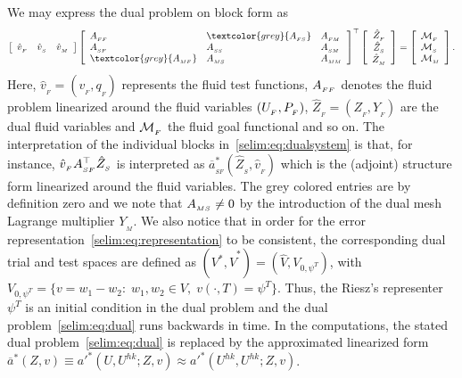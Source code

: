 We may express the dual problem on block form as
\begin{eqnarray}
\label{selim:eq:dualsystem}
\left[\begin{array}{ccc} \hat{v}_{_{F}} & \hat{v}_{_{S}} & \hat{v}_{_{M}}
  \end{array} \right]
\left[\begin{array}{lll} \AFF & \textcolor{grey}{\AFS} & \AFM
    \\ \ASF & \ASS & \ASM \\ \textcolor{grey}{\AMF} & \AMS &
    \AMM
\end{array} \right]^{\top}
\left[ \begin{array}{c} \hat{Z}_{_{F}} \\ \hat{Z}_{_{S}}
    \\ \hat{Z}_{_{M}} \end{array} \right] =\left[ \begin{array}{l}
    \M_{_{F}}\\ \M_{{_S}}\\ \M_{_{M}} \end{array} \right].
\end{eqnarray}
Here, $\hat{v}_{_{F}} = (v_{_{F}}, q_{_{F}})$ represents the fluid
test functions, $A_{_{FF}}$ denotes the fluid problem linearized around the
fluid variables $(U_{_{F}},P_{_{F}})$, $\hat{Z}_{_{F}} = (Z_{_{F}}, Y_{_{F}})$
are the dual fluid variables and $\mathcal{M}_{_{F}}$ the fluid goal functional
and so on. The interpretation of the individual blocks
in~\eqref{selim:eq:dualsystem} is that, for instance,
$\hat{v}_{_{F}}A_{_{SF}}^{\top}\hat{Z}_{_{S}} $ is interpreted as
$\overline{a}^*_{_{SF}}(\hat{Z}_{_{S}}, \hat{v}_{_{F}})$ which is the
(adjoint) structure form linearized around the fluid variables.  The
grey colored entries are by definition zero and we note that $A_{_{MS}}
\neq 0$ by the introduction of the dual mesh Lagrange multiplier
$Y_{_{M}}$. We also notice that in order for the error
representation~\eqref{selim:eq:representation} to be consistent, the
corresponding dual trial and test spaces are defined as $(V^*,
\hat{V}^*) = (\hat{V}, V_{0, \psi^T})$, with $V_{0,\psi^T} =
\{v=w_1-w_2:\;w_1,w_2\in V , \;v(\cdot, T) = \psi^T \}$. Thus, the
Riesz's representer $\psi^T$ is an initial condition in the dual
problem and the dual problem~\eqref{selim:eq:dual} runs backwards in
time.  In the computations, the stated dual
problem~\eqref{selim:eq:dual} is replaced by the approximated
linearized form $\overline{a}^{*}(Z, v) \equiv a'^{*}(U,U^{hk}; Z, v)
\approx a'^{*}(U^{hk}, U^{hk}; Z, v) $.

